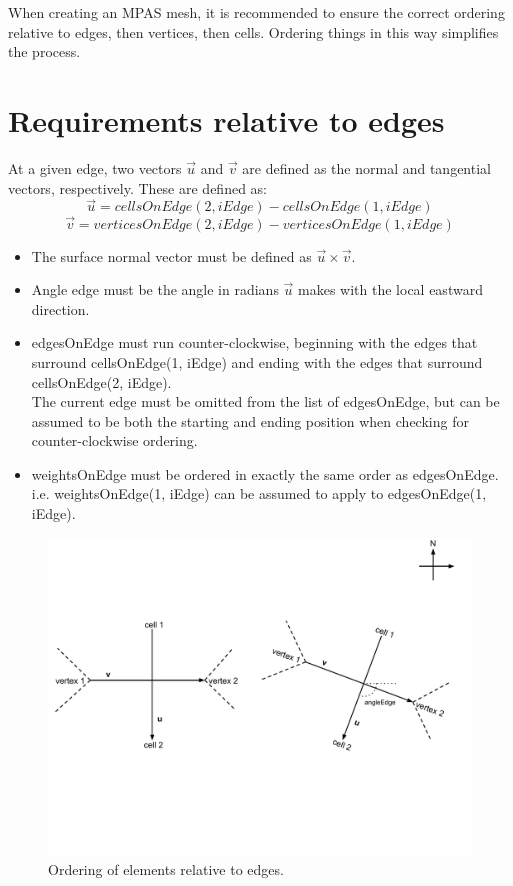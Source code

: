 \documentclass[11pt]{report}
\begin{document}
When creating an MPAS mesh, it is recommended to ensure the correct ordering
relative to edges, then vertices, then cells. Ordering things in this way
simplifies the process.

\section{Requirements relative to edges}

At a given edge, two vectors $\vec{u}$ and $\vec{v}$ are defined as the normal and tangential vectors, respectively. These are defined as:
\begin{equation}
	\vec{u} = cellsOnEdge(2, iEdge) - cellsOnEdge(1, iEdge)
\end{equation}
\begin{equation}
	\vec{v} = verticesOnEdge(2, iEdge) - verticesOnEdge(1, iEdge)
\end{equation}

\begin{itemize}
	\item The surface normal vector must be defined as $\vec{u} \times \vec{v}$.
	\item Angle edge must be the angle in radians $\vec{u}$ makes with the local eastward direction.
	\item edgesOnEdge must run counter-clockwise, beginning with the edges that surround cellsOnEdge(1, iEdge) and ending with the edges that surround cellsOnEdge(2, iEdge). \\
		  The current edge must be omitted from the list of edgesOnEdge, but can be assumed to be both the starting and ending position when checking for counter-clockwise ordering.
	\item weightsOnEdge must be ordered in exactly the same order as edgesOnEdge. i.e. weightsOnEdge(1, iEdge) can be assumed to apply to edgesOnEdge(1, iEdge).
\end{itemize}

\begin{figure}[htp!]
	\centering
	\includegraphics[scale=0.4]{figures/EdgeDiagram.pdf}
	\caption{Ordering of elements relative to edges.}
\end{figure}
\end{document}
